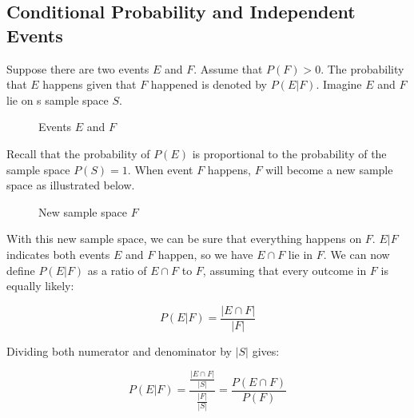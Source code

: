 \subsection{Conditional Probability and Independent Events}

Suppose there are two events $E$ and $F$. Assume that $P(F)>0$. The probability that $E$ happens given that $F$ happened is denoted by $P(E|F)$. Imagine $E$ and $F$ lie on s sample space $S$.

\def\firstcircle{(0,0) circle (1.8cm)}
\def\secondcircle{(0:2cm) circle (1.8cm)}
\begin{figure}[H]
	\centering
	\caption{Events $E$ and $F$}
\end{figure}

Recall that the probability of $P(E)$ is proportional to the probability of the sample space $P(S)=1$. When event $F$ happens, $F$ will become a new sample space as illustrated below.

\begin{figure}[H]
	\centering
	\caption{New sample space $F$}
\end{figure}

With this new sample space, we can be sure that everything happens on $F$. $E|F$ indicates both events $E$ and $F$ happen, so we have $E \cap F$ lie in $F$. We can now define $P(E|F)$ as a ratio of $E \cap F$ to $F$, assuming that every outcome in $F$ is equally likely:

$$P(E|F)=\frac{|E \cap F|}{|F|}$$

Dividing both numerator and denominator by $|S|$ gives:

$$P(E|F)=\frac{\frac{|E \cap F|}{|S|}}{\frac{|F|}{|S|}}=\frac{P(E \cap F)}{P(F)}$$

